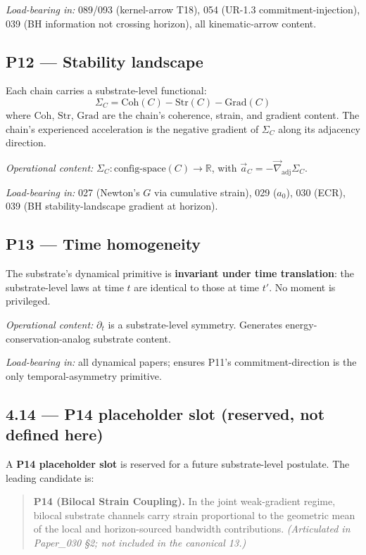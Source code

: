 \documentclass[11pt,a4paper]{article}
\begin{document}
\emph{Load-bearing in:} 089/093 (kernel-arrow T18), 054 (UR-1.3 commitment-injection), 039 (BH information not crossing horizon), all kinematic-arrow content.

\subsection*{P12 --- Stability landscape}

Each chain carries a substrate-level functional:
\[
\Sigma_C = \mathrm{Coh}(C) - \mathrm{Str}(C) - \mathrm{Grad}(C)
\]
where $\mathrm{Coh}$, $\mathrm{Str}$, $\mathrm{Grad}$ are the chain's coherence, strain, and gradient content. The chain's experienced acceleration is the negative gradient of $\Sigma_C$ along its adjacency direction.

\emph{Operational content:} $\Sigma_C: \mathrm{config\text{-}space}(C) \to \mathbb{R}$, with $\vec{a}_C = -\vec{\nabla}_\mathrm{adj} \Sigma_C$.

\emph{Load-bearing in:} 027 (Newton's $G$ via cumulative strain), 029 ($a_0$), 030 (ECR), 039 (BH stability-landscape gradient at horizon).

\subsection*{P13 --- Time homogeneity}

The substrate's dynamical primitive is \textbf{invariant under time translation}: the substrate-level laws at time $t$ are identical to those at time $t'$. No moment is privileged.

\emph{Operational content:} $\partial_t$ is a substrate-level symmetry. Generates energy-conservation-analog substrate content.

\emph{Load-bearing in:} all dynamical papers; ensures P11's commitment-direction is the only temporal-asymmetry primitive.

\subsection{4.14 --- P14 placeholder slot (reserved, not defined here)}

A \textbf{P14 placeholder slot} is reserved for a future substrate-level postulate. The leading candidate is:

\begin{quote}
\textbf{P14 (Bilocal Strain Coupling).} In the joint weak-gradient regime, bilocal substrate channels carry strain proportional to the geometric mean of the local and horizon-sourced bandwidth contributions. \emph{(Articulated in Paper\_030 \S2; not included in the canonical 13.)}
\end{quote}
\end{document}
